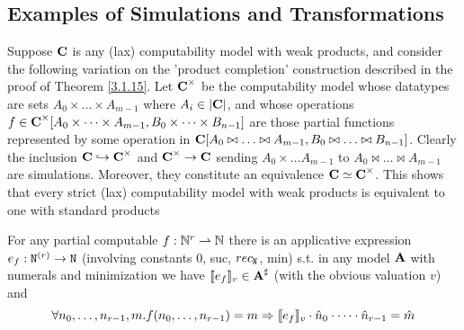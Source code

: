\documentclass[11pt]{article}
\begin{document}
\subsection{Examples of Simulations and Transformations}
\label{sec:org55dd87e}
\begin{examplle}[]
Suppose \(\operatorname{\textbf{C}}\) is any (lax) computability model with weak products, and consider the following
variation on the 'product completion' construction described in the proof of Theorem \ref{3.1.15}.
Let \(\operatorname{\textbf{C}}^\times\) be the computability model whose datatypes are sets \(A_0\times\dots\times A_{m-1}\)
where \(A_i\in\abs{\bC}\), and whose operations \(f\in\operatorname{\textbf{C}}^\times[A_0\times\dots\times A_{m-1},B_0\times\dots\times B_{n-1}]\) are those
partial functions represented by some operation in \(\operatorname{\textbf{C}}[A_0\bowtie\dots\bowtie A_{m-1},B_0\bowtie\dots\bowtie B_{n-1}]\). Clearly
the inclusion \(\operatorname{\textbf{C}}\hookrightarrow\operatorname{\textbf{C}}^\times\) and \(\operatorname{\textbf{C}}^\times\to\operatorname{\textbf{C}}\) sending \(A_0\times\dots A_{m-1}\) to \(A_0\bowtie\dots\bowtie A_{m-1}\) are
simulations. Moreover, they constitute an equivalence \(\operatorname{\textbf{C}}\simeq\operatorname{\textbf{C}}^\times\). This shows that every strict
(lax) computability model with weak products is equivalent to one with standard products
\end{examplle}

\begin{proposition}[]
For any partial computable \(f:\mathbb{N}^r\rightharpoonup\mathbb{N}\) there is an applicative
expression \(e_f:\texttt{N}^{(r)}\to\texttt{N}\) (involving constants 0, suc, \(rec_{\texttt{N}}\), min) s.t. in any
model \(\operatorname{\textbf{A}}\) with numerals and minimization we have \(\llbracket e_f \rrbracket_v\in\operatorname{\textbf{A}}^\sharp\) (with the obvious
valuation \(v\)) and
\begin{equation*}
\forall n_0,\dots,n_{r-1},m. f(n_0,\dots,n_{r-1})=m\Rightarrow\llbracket e_f \rrbracket_v\cdot\hat{n}_0\cdot\dots\cdot\hat{n}_{r-1}=\hat{m}
\end{equation*}
\end{proposition}
\end{document}
